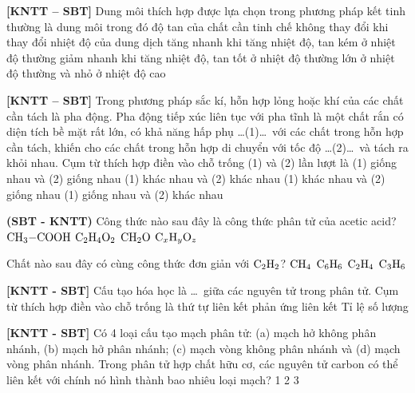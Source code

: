 \documentclass[12pt,a4paper]{article}
\begin{document}
\begin{ex}
\textbf{[KNTT – SBT]} Dung môi thích hợp được lựa chọn trong phương pháp kết tinh thường là dung môi trong đó độ tan của chất cần tinh chế
\choice
{không thay đổi khi thay đổi nhiệt độ của dung dịch}
{\True tăng nhanh khi tăng nhiệt độ, tan kém ở nhiệt độ thường}
{giảm nhanh khi tăng nhiệt độ, tan tốt ở nhiệt độ thường}
{lớn ở nhiệt độ thường và nhỏ ở nhiệt độ cao}

\end{ex}

\begin{ex}
\textbf{[KNTT – SBT]} Trong phương pháp sắc kí, hỗn hợp lỏng hoặc khí của các chất cần tách là pha động. Pha động tiếp xúc liên tục với pha tĩnh là một chất rắn có diện tích bề mặt rất lớn, có khả năng hấp phụ \dots(1)\dots\ với các chất trong hỗn hợp cần tách, khiến cho các chất trong hỗn hợp di chuyển với tốc độ \dots(2)\dots\ và tách ra khỏi nhau. Cụm từ thích hợp điền vào chỗ trống (1) và (2) lần lượt là
\choice
{(1) giống nhau và (2) giống nhau}
{\True (1) khác nhau và (2) khác nhau}
{(1) khác nhau và (2) giống nhau}
{(1) giống nhau và (2) khác nhau}

\end{ex}

\begin{ex}
\textbf{(SBT - KNTT)} Công thức nào sau đây là công thức phân tử của acetic acid?
\choice
{$\ce{CH3-COOH}$}
{\True $\ce{C2H4O2}$}
{$\ce{CH2O}$}
{$\ce{C_xH_yO_z}$}

\end{ex}

\begin{ex}
Chất nào sau đây có cùng công thức đơn giản với $\ce{C2H2}$?
\choice
{$\ce{CH4}$}
{\True $\ce{C6H6}$}
{$\ce{C2H4}$}
{$\ce{C3H6}$}

\end{ex}

\begin{ex}
\textbf{[KNTT - SBT]} Cấu tạo hóa học là \dots\ giữa các nguyên tử trong phân tử. Cụm từ thích hợp điền vào chỗ trống là
\choice
{\True thứ tự liên kết}
{phản ứng}
{liên kết}
{Tỉ lệ số lượng}

\end{ex}

\begin{ex}
\textbf{[KNTT - SBT]} Có 4 loại cấu tạo mạch phân tử: (a) mạch hở không phân nhánh, (b) mạch hở phân nhánh; (c) mạch vòng không phân nhánh và (d) mạch vòng phân nhánh. Trong phân tử hợp chất hữu cơ, các nguyên tử carbon có thể liên kết với chính nó hình thành bao nhiêu loại mạch?
\choice
{1}
{2}
{3}
{}

\end{ex}
\end{document}
